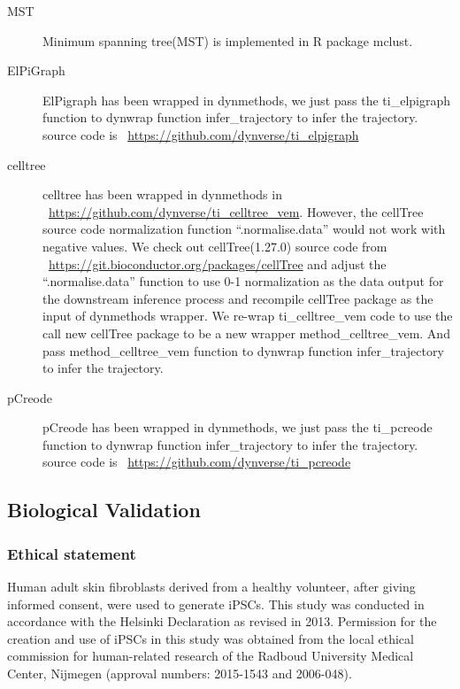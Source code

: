 \begin{description}
	\item[MST] 
	Minimum spanning tree(MST) is implemented in R package mclust.
	\item[ElPiGraph] 
	ElPigraph has been wrapped in dynmethods, we just pass the ti\_elpigraph function to dynwrap function infer\_trajectory to infer the trajectory. source code is ~\url{https://github.com/dynverse/ti_elpigraph}
	\item[celltree] 
	celltree has been wrapped in dynmethods in ~\url{https://github.com/dynverse/ti\_celltree\_vem}. However, the cellTree source code normalization function ``.normalise.data'' would not work with negative values. We check out cellTree(1.27.0) source code from ~\url{https://git.bioconductor.org/packages/cellTree} and adjust the ``.normalise.data'' function to use 0-1 normalization as the data output for the downstream inference process and recompile cellTree package as the input of dynmethods wrapper. We re-wrap ti\_celltree\_vem code to use the call new cellTree package to be a new wrapper method\_celltree\_vem. And pass method\_celltree\_vem function to dynwrap function infer\_trajectory to infer the trajectory.
	\item[pCreode] 
	pCreode has been wrapped in dynmethods, we just pass the ti\_pcreode function to dynwrap function infer\_trajectory to infer the trajectory. source code is ~\url{https://github.com/dynverse/ti\_pcreode}
\end{description}

\subsection{Biological Validation}


\subsubsection{Ethical statement}

Human adult skin fibroblasts derived from a healthy volunteer, after giving informed consent, were used to generate iPSCs. This study was conducted in accordance with the Helsinki Declaration as revised in 2013. Permission for the creation and use of iPSCs in this study was obtained from the local ethical commission for human-related research of the Radboud University Medical Center, Nijmegen (approval numbers: 2015-1543 and 2006-048). 

